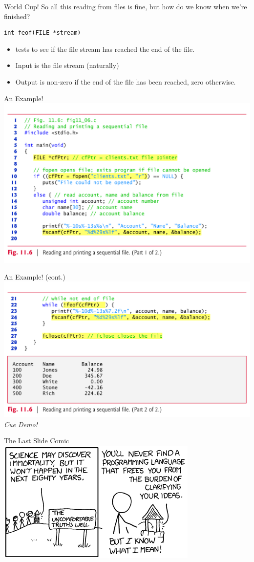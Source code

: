 \documentclass[11pt]{beamer}
\let\OldTexttt\texttt
\renewcommand{\texttt}[1]{\OldTexttt{\color{teal}{#1}}}
\begin{document}
\begin{frame}[fragile=singleslide]{\texttt{feof()} World Cup!}
So all this reading from files is fine, but how do we know when we're finished? 
\begin{lstlisting}[style=C]
int feof(FILE *stream)
\end{lstlisting}
\begin{itemize}
\item \texttt{feof()} tests to see if the file stream has reached the end of the file.
\item Input is the file stream (naturally)
\item Output is non-zero if the end of the file has been reached, zero otherwise.  
\end{itemize}
\end{frame}

\begin{frame}{An Example!}
\center
\includegraphics[scale=0.12]{ioex.png}
\end{frame}

\begin{frame}{An Example! (cont.)}
\center
\includegraphics[scale=0.12]{ioex2.png}
\emph{Cue Demo!}
\end{frame}

\begin{frame}{The Last Slide Comic}
\center
\includegraphics[scale=0.6]{uncomfortable.png}
\end{frame}
\end{document}
